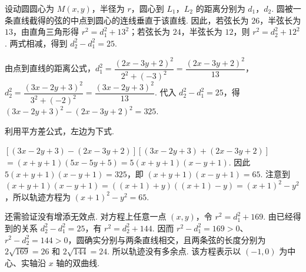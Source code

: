 \documentclass[UTF8,a4paper,oneside,11pt]{ctexbook}
\begin{document}
\begin{solution}
设动圆圆心为 \(M\left(x,y\right)\)，半径为 \(r\)，圆心到 \(L_1\)，\(L_2\) 的距离分别为 \(d_1\)，\(d_2\). 圆被一条直线截得的弦的中点到圆心的连线垂直于该直线. 因此，若弦长为 \(26\)，半弦长为 \(13\)，由直角三角形得 \(r^2=d_1^2+13^2\)；若弦长为 \(24\)，半弦长为 \(12\)，则 \(r^2=d_2^2+12^2\). 两式相减，得到 \(d_2^2-d_1^2=25\).

由点到直线的距离公式，\(d_1^2=\dfrac{\left(2x-3y+2\right)^2}{2^2+(-3)^2}=\dfrac{\left(2x-3y+2\right)^2}{13}\)，\(d_2^2=\dfrac{\left(3x-2y+3\right)^2}{3^2+(-2)^2}=\dfrac{\left(3x-2y+3\right)^2}{13}\). 代入 \(d_2^2-d_1^2=25\)，得
\(\left(3x-2y+3\right)^2-\left(2x-3y+2\right)^2=325\).

利用平方差公式，左边为下式.

\(\left[(3x-2y+3)-(2x-3y+2)\right]\left[(3x-2y+3)+(2x-3y+2)\right]\)
\(=(x+y+1)(5x-5y+5)=5(x+y+1)(x-y+1)\).
因此 \(5(x+y+1)(x-y+1)=325\)，即
\((x+y+1)(x-y+1)=65\). 注意到
\((x+y+1)(x-y+1)=\left((x+1)+y\right)\left((x+1)-y\right)=(x+1)^2-y^2\)，所以轨迹方程为
\((x+1)^2-y^2=65\).

还需验证没有增添无效点. 对方程上任意一点 \(\left(x,y\right)\)，令 \(r^2=d_1^2+169\). 由已经得到的关系 \(d_2^2-d_1^2=25\)，有 \(r^2=d_2^2+144\). 因而 \(r^2-d_1^2=169>0\)、\(r^2-d_2^2=144>0\)，圆确实分别与两条直线相交，且两条弦的长度分别为 \(2\sqrt{169}=26\) 和 \(2\sqrt{144}=24\). 所以轨迹没有多余点. 该方程表示以 \(\left(-1,0\right)\) 为中心、实轴沿 \(x\) 轴的双曲线.
\end{solution}

\end{document}
